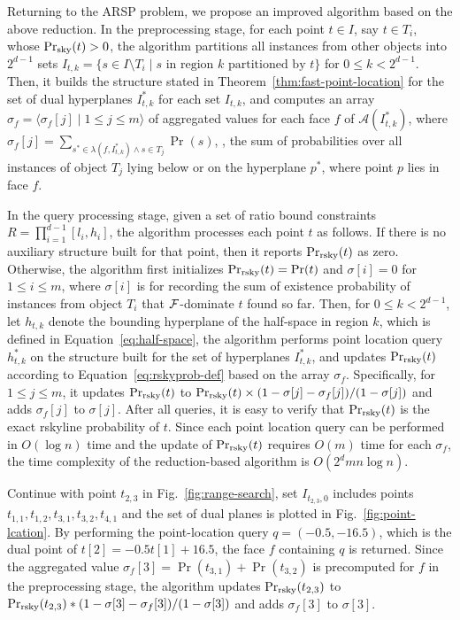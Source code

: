 Returning to the ARSP problem, we propose an improved algorithm based on the above reduction.
In the preprocessing stage, for each point $t \in I$, say $t \in T_i$, whose $\Pr_{\rm sky}(t) > 0$, the algorithm partitions all instances from other objects into $2^{d-1}$ sets $I_{t, k}  = \{s \in I \setminus T_i \mid s \text{ in region } k \text{ partitioned by } t\}$ for $0 \le k < 2^{d-1}$.
Then, it builds the structure stated in Theorem~\ref{thm:fast-point-location} for the set of dual hyperplanes $I^*_{t, k}$ for each set $I_{t, k}$, and computes an array $\sigma_f = \langle \sigma_f[j] \mid 1 \le j \le m \rangle$ of aggregated values for each face $f$ of $\mathcal{A}(I^*_{t, k})$, where $\sigma_f[j] = \sum_{s^* \in \lambda(f, I^*_{t, k}) \wedge s \in T_j}\Pr(s)$, \ie, the sum of probabilities over all instances of object $T_j$ lying below or on the hyperplane $p^*$, where point $p$ lies in face $f$.

In the query processing stage, given a set of ratio bound constraints $R = \prod^{d-1}_{i = 1}[l_i, h_i]$, the algorithm processes each point $t$ as follows.
If there is no auxiliary structure built for that point, then it reports $\Pr_{\rm rsky}(t)$ as zero.
Otherwise, the algorithm first initializes $\Pr_{\rm rsky}(t) = \Pr(t)$ and $\sigma[i] = 0$ for $1 \le i \le m$, where $\sigma[i]$ is for recording the sum of existence probability of instances from object $T_i$ that $\mathcal{F}$-dominate $t$ found so far.
Then, for $0 \le k < 2^{d-1}$, let $h_{t, k}$ denote the bounding hyperplane of the half-space in region $k$, which is defined in Equation~\ref{eq:half-space}, the algorithm performs point location query $h^*_{t, k}$ on the structure built for the set of hyperplanes $I^*_{t, k}$, and updates $\Pr_{\rm rsky}(t)$ according to Equation~\ref{eq:rskyprob-def} based on the array $\sigma_f$.
Specifically, for $1 \le j \le m$, it updates $\Pr_{\rm rsky}(t)$ to $\Pr_{\rm rsky}(t) \times (1 - \sigma[j] - \sigma_f[j])/(1 - \sigma[j])$ and adds $\sigma_f[j]$ to $\sigma[j]$.
After all queries, it is easy to verify that $\Pr_{\rm rsky}(t)$ is the exact rskyline probability of $t$.
Since each point location query can be performed in $O(\log{n})$ time and the update of $\Pr_{\rm rsky}(t)$ requires $O(m)$ time for each $\sigma_f$, the time complexity of the reduction-based algorithm is $O(2^dmn\log{n})$.

\begin{example}
	Continue with point $t_{2, 3}$ in Fig.~\ref{fig:range-search}, set $I_{t_{2, 3}, 0}$ includes points $t_{1, 1}, t_{1, 2}, t_{3, 1}, t_{3, 2}, t_{4, 1}$ and the set of dual planes is plotted in Fig.~\ref{fig:point-lcation}.
	By performing the point-location query $q = (-0.5, -16.5)$, which is the dual point of $t[2] = -0.5t[1] + 16.5$, the face $f$ containing $q$ is returned.
	Since the aggregated value $\sigma_f[3] = \Pr(t_{3,1}) + \Pr(t_{3, 2})$ is precomputed for $f$ in the preprocessing stage, the algorithm updates $\Pr_{\rm rsky}(t_{2, 3})$ to $\Pr_{\rm rsky}(t_{2, 3}) * (1 - \sigma[3] - \sigma_f[3])/(1 - \sigma[3])$ and adds $\sigma_f[3]$ to $\sigma[3]$.
\end{example}

